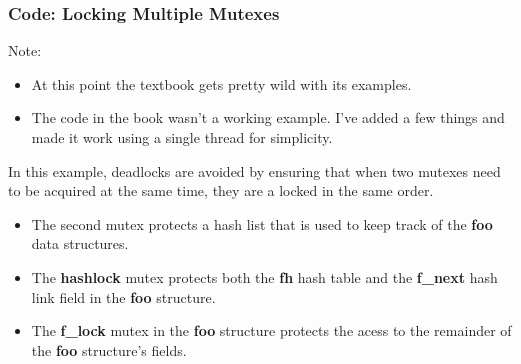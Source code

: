 \documentclass{article}
\begin{document}
\subsubsection{Code: Locking Multiple Mutexes}
{\Large Note:}
\begin{itemize}
    \item At this point the textbook gets pretty wild with its examples.
    \item The code in the book wasn't a working example. I've added a few things and made it work using a single thread for simplicity. \newline
\end{itemize}

In this example, deadlocks are avoided by ensuring that when two mutexes need to be acquired at the same time, they are a locked in the same order.

\begin{itemize}
    \item The second mutex protects a hash list that is used to keep track of the \textbf{foo} data structures.
    \item The \textbf{hashlock} mutex protects both the \textbf{fh} hash table and the \textbf{f\_next} hash link field in the \textbf{foo} structure.
    \item The \textbf{f\_lock} mutex in the \textbf{foo} structure protects the acess to the remainder of the \textbf{foo} structure's fields.
\end{itemize}
\end{document}
